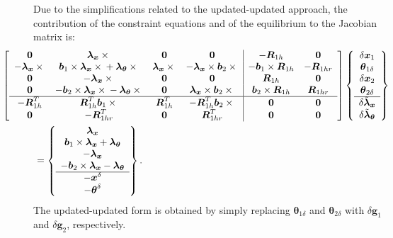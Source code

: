 \documentclass[10pt,dvips,fleqn,subeqn]{report}
\newcommand{\T}[1]{\boldsymbol{#1}}
\begin{document}
Due to the simplifications related to the updated-updated approach,
the contribution of the constraint equations and of the equilibrium 
to the Jacobian matrix is: 
\begin{align}
	\small
	&\hspace{-12mm}%
	\sqbr{\matr{cccc|cc}{
	\T{0} & 
	\T{\lambda}_{\T{x}}\times{} & 
	\T{0} & 
	\T{0} & 
	-\T{R}_{1h} &
	\T{0} \\
	-\T{\lambda}_{\T{x}}\times{} & 
	\T{b}_1\times\T{\lambda}_{\T{x}}\times{} + \T{\lambda}_{\T{\theta}}\times{} &
	\T{\lambda}_{\T{x}}\times{} & 
	-\T{\lambda}_{\T{x}}\times\T{b}_2\times{} & 
	-\T{b}_1\times\T{R}_{1h} &
	-\T{R}_{1hr} \\
	\T{0} & 
	-\T{\lambda}_{\T{x}}\times{} &
	\T{0} &
	\T{0} &
	\T{R}_{1h} &
	\T{0} \\
	\T{0} & 
	-\T{b}_2\times\T{\lambda}_{\T{x}}\times{} - \T{\lambda}_{\T{\theta}}\times{} &
	\T{0} &
	\T{\lambda}_{\T{x}}\times\T{b}_2\times{} &
	\T{b}_2\times\T{R}_{1h} & 
	\T{R}_{1hr} \\
	\hline
	-\T{R}_{1h}^T &
	\T{R}_{1h}^T\T{b}_1\times{} & 
	\T{R}_{1h}^T &
	-\T{R}_{1h}^T\T{b}_2\times{} & 
	\T{0} &
	\T{0} \\
	\T{0} &
	-\T{R}_{1hr}^T &
	\T{0} &
	\T{R}_{1hr}^T &
	\T{0} & 
	\T{0}
	}} \cubr{\cvvect{
		\delta\T{x}_1 \\
		\T{\theta}_{1\delta} \\
		\delta\T{x}_2 \\
		\T{\theta}_{2\delta} \\
		\hline
		\delta\tilde{\T{\lambda}}_{\T{x}} \\
		\delta\tilde{\T{\lambda}}_{\T{\theta}}
	}} \nonumber \\
	&= \cubr{\cvvect{
	\T{\lambda}_{\T{x}} \\
	\T{b}_1 \times \T{\lambda}_{\T{x}} + \T{\lambda}_{\T{\theta}} \\
	- \T{\lambda}_{\T{x}} \\
	- \T{b}_2 \times \T{\lambda}_{\T{x}} - \T{\lambda}_{\T{\theta}} \\
	\hline
	- \T{x}^{\delta} \\
	- \T{\theta}^{\delta}
	}} .
\end{align}
The updated-updated form is obtained by simply replacing
$\T{\theta}_{1\delta}$ and $\T{\theta}_{2\delta}$
with $\delta\T{g}_1$ and $\delta\T{g}_2$, respectively.
\end{document}
